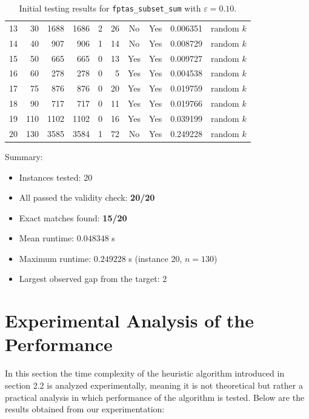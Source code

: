 \documentclass[12pt,a4paper]{article}
\theoremstyle{definition}
\begin{document}
\begin{table}[H]
\begin{tabular}{rrrrrrccrl}
    13 &  30 & 1688 & 1686 &   2 &  26 & No & Yes & 0.006351 & random $k$ \\
    14 &  40 &  907 &  906 &   1 &  14 & No & Yes & 0.008729 & random $k$ \\
    15 &  50 &  665 &  665 &   0 &  13 & Yes & Yes & 0.009727 & random $k$ \\
    16 &  60 &  278 &  278 &   0 &   5 & Yes & Yes & 0.004538 & random $k$ \\
    17 &  75 &  876 &  876 &   0 &  20 & Yes & Yes & 0.019759 & random $k$ \\
    18 &  90 &  717 &  717 &   0 &  11 & Yes & Yes & 0.019766 & random $k$ \\
    19 & 110 & 1102 & 1102 &   0 &  16 & Yes & Yes & 0.039199 & random $k$ \\
    20 & 130 & 3585 & 3584 &   1 &  72 & No & Yes & 0.249228 & random $k$ \\
    \bottomrule
  \end{tabular}
  \caption{Initial testing results for \texttt{fptas\_subset\_sum} with \(\varepsilon = 0.10\).}
  \label{tab:heuristic-initial}
\end{table}

\noindent Summary:

\begin{itemize}[noitemsep]
  \item Instances tested: 20
  \item All passed the validity check: \textbf{20/20}
  \item Exact matches found: \textbf{15/20}
  \item Mean runtime: \(0.048348\) s
  \item Maximum runtime: \(0.249228\) s (instance 20, \(n = 130\))
  \item Largest observed gap from the target: 2
\end{itemize}




\section{Experimental Analysis of the Performance}
In this section the time complexity of the heuristic algorithm introduced in section 2.2 is analyzed experimentally, meaning it is not theoretical but rather a practical analysis in which performance of the algorithm is tested. Below are the results obtained from our experimentation:
\end{document}

